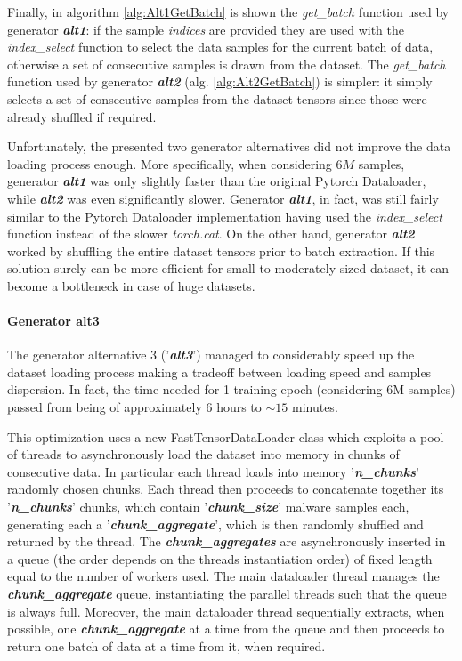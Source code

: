 \documentclass[pdfa%
,cucitura%
]{toptesi}
\begin{document}
Finally, in algorithm \ref{alg:Alt1GetBatch} is shown the \textit{get\_batch} function used by generator \textit{\textbf{alt1}}: if the sample \textit{indices} are provided they are used with the \textit{index\_select} function to select the data samples for the current batch of data, otherwise a set of consecutive samples is drawn from the dataset. The \textit{get\_batch} function used by generator \textit{\textbf{alt2}} (alg. \ref{alg:Alt2GetBatch}) is simpler: it simply selects a set of consecutive samples from the dataset tensors since those were already shuffled if required.

Unfortunately, the presented two generator alternatives did not improve the data loading process enough. More specifically, when considering $6M$ samples, generator \textit{\textbf{alt1}} was only slightly faster than the original Pytorch Dataloader, while \textit{\textbf{alt2}} was even significantly slower. Generator \textit{\textbf{alt1}}, in fact, was still fairly similar to the Pytorch Dataloader implementation having used the \textit{index\_select} function instead of the slower \textit{torch.cat}. On the other hand, generator \textit{\textbf{alt2}} worked by shuffling the entire dataset tensors prior to batch extraction. If this solution surely can be more efficient for small to moderately sized dataset, it can become a bottleneck in case of huge datasets.

\paragraph{Generator alt3}
The generator alternative 3 ('\textit{\textbf{alt3}}') managed to considerably speed up the dataset loading process making a tradeoff between loading speed and samples dispersion. In fact, the time needed for 1 training epoch (considering 6M samples) passed from being of approximately 6 hours to $\sim15$ minutes.

This optimization uses a new FastTensorDataLoader class which exploits a pool of threads to asynchronously load the dataset into memory in chunks of consecutive data. In particular each thread loads into memory '\textit{\textbf{n\_chunks}}' randomly chosen chunks. Each thread then proceeds to concatenate together its '\textit{\textbf{n\_chunks}}' chunks, which contain '\textit{\textbf{chunk\_size}}' malware samples each, generating each a '\textit{\textbf{chunk\_aggregate}}', which is then randomly shuffled and returned by the thread. The \textit{\textbf{chunk\_aggregates}} are asynchronously inserted in a queue (the order depends on the threads instantiation order) of fixed length equal to the number of workers used. The main dataloader thread manages the \textit{\textbf{chunk\_aggregate}} queue, instantiating the parallel threads such that the queue is always full. Moreover, the main dataloader thread sequentially extracts, when possible, one \textit{\textbf{chunk\_aggregate}} at a time from the queue and then proceeds to return one batch of data at a time from it, when required.
\end{document}
